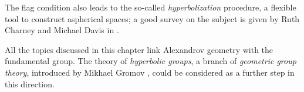 The flag condition also leads to the so-called {}\emph{hyperbolization} procedure, a flexible tool to construct  aspherical spaces;
a good survey on the subject is given by Ruth Charney and Michael Davis in \cite{charney-davis}.

All the topics discussed in this chapter link Alexandrov geometry with the fundamental group.
The theory of {}\emph{hyperbolic groups}, 
a branch of \emph{geometric group theory}, 
introduced by 
Mikhael Gromov \cite{gromov:hyp-groups},
could be considered as a further step in this direction.




